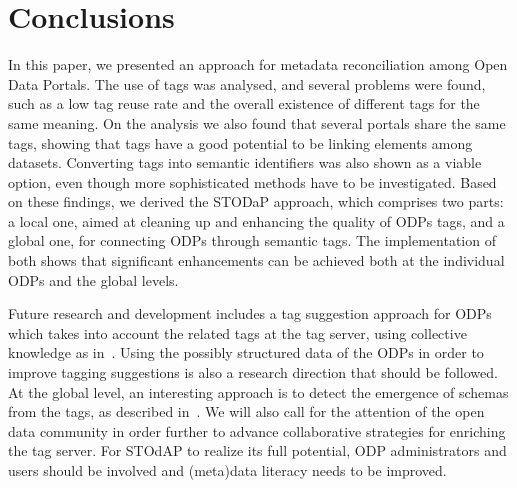 \documentclass[conference]{IEEEtran}
\begin{document}

\section{Conclusions}
\label{sec:conclusions}

In this paper, we presented an approach for metadata reconciliation among Open Data Portals.
The use of tags was analysed, and several problems were found, such as a low tag reuse rate and the overall existence of different tags for the same meaning.
On the analysis we also found that several portals share the same tags, showing that tags have a good potential to be linking elements among datasets.
Converting tags into semantic identifiers was also shown as a viable option, even though more sophisticated methods have to be investigated. 
Based on these findings, we derived the STODaP approach, which comprises two parts: 
a local one, aimed at cleaning up and enhancing the quality of ODPs tags, and 
a global one, for connecting ODPs through semantic tags.
The implementation of both shows that significant enhancements can be achieved both at the individual ODPs and the global levels.

Future research and development includes a tag suggestion approach for ODPs which takes into account the related tags at the tag server, using collective knowledge as in~\cite{Sigurbjornsson2008}.
Using the possibly structured data of the ODPs in order to improve tagging suggestions is also a research direction that should be followed.
At the global level, an interesting approach is to detect the emergence of schemas from the tags, as described in~\cite{Robu2009}.
We will also call for the attention of the open data community in order further to advance collaborative strategies for enriching the tag server.
For STOdAP to realize its full potential, ODP administrators and users should be involved and (meta)data literacy needs to be improved.
\end{document}
